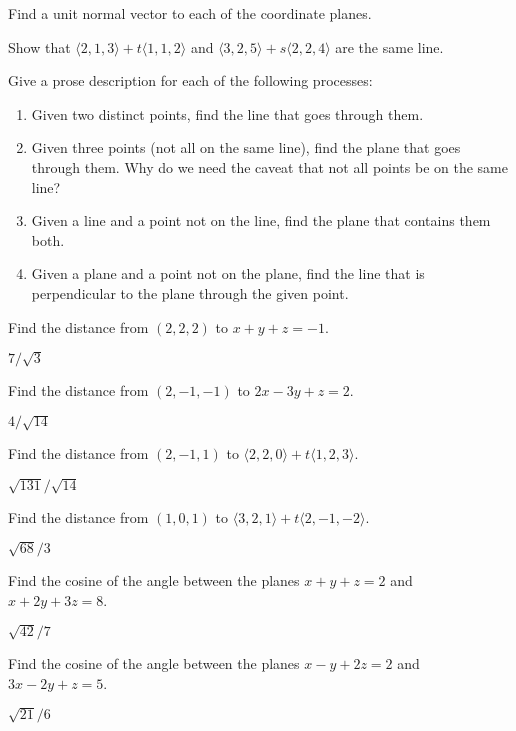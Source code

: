 \begin{enumialphparenastyle}
\begin{ex}
Find a unit normal vector to each of the coordinate planes.
\end{ex}

\begin{ex}
Show that $\langle 2,1,3 \rangle + t \langle 1,1,2 \rangle$ and
$\langle 3, 2, 5 \rangle + s \langle 2, 2, 4 \rangle$ are the same
line.
\end{ex}

\begin{ex}
Give a prose description for each of the following processes:
\begin{enumerate}
\item	Given two distinct points, find the line that goes through them.
\item	Given three points (not all on the same line), find the plane
  that goes through them. Why do we need the caveat that not all
  points be on the same line?
\item	Given a line and a point not on the line, find the plane that
contains them both.
\item	Given a plane and a point not on the plane, find the line that
is perpendicular to the plane through the given point.
\end{enumerate}
\end{ex}

\begin{ex}
Find the distance from $(2,2,2)$ to $x+y+z=-1$.
\begin{sol}
	$7/\sqrt3$
\end{sol}
\end{ex}

\begin{ex}
Find the distance from $(2,-1,-1)$ to $2x-3y+z=2$.
\begin{sol}
	$4/\sqrt{14}$
\end{sol}
\end{ex}

\begin{ex}
Find the distance from $(2,-1,1)$ to 
$\langle 2,2,0\rangle+t\langle 1,2,3\rangle$.
\begin{sol}
	$\sqrt{131}/\sqrt{14}$
\end{sol}
\end{ex}

\begin{ex}
Find the distance from $(1,0,1)$ to 
$\langle 3,2,1\rangle+t\langle 2,-1,-2\rangle$.
\begin{sol}
	$\sqrt{68}/3$
\end{sol}
\end{ex}

\begin{ex}
Find the cosine of the angle
between the planes $x+y+z=2$ and $x+2y+3z=8$.
\begin{sol}
	$\sqrt{42}/7$
\end{sol}
\end{ex}

\begin{ex}
Find the cosine of the angle
between the planes $x-y+2z=2$ and $3x-2y+z=5$.
\begin{sol}
	$\sqrt{21}/6$
\end{sol}
\end{ex}

\end{enumialphparenastyle}

